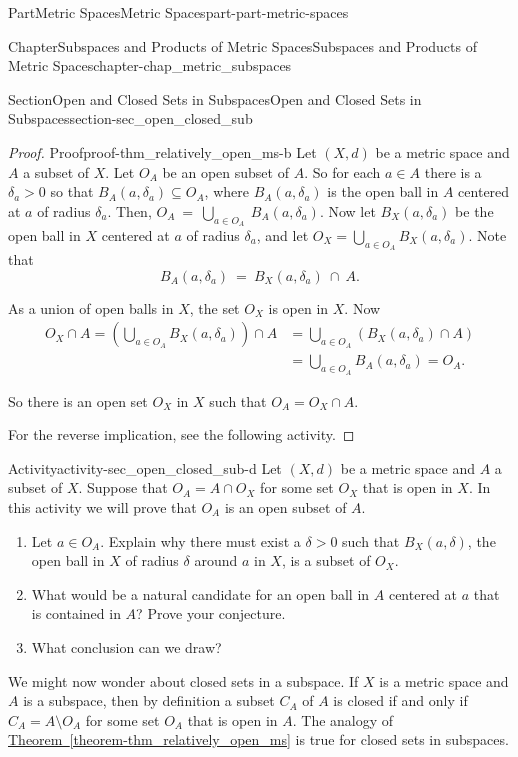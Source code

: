 \documentclass[oneside,10pt,]{book}
\newcommand{\xreffont}{\relax}
\numberwithin{equation}{chapter}
\newcommand{\gt}{>}
\newcommand{\amp}{&}
\begin{document}
\begin{partptx}{Part}{Metric Spaces}{}{Metric Spaces}{}{}{part-part-metric-spaces}
\begin{chapterptx}{Chapter}{Subspaces and Products of Metric Spaces}{}{Subspaces and Products of Metric Spaces}{}{}{chapter-chap_metric_subspaces}
\begin{sectionptx}{Section}{Open and Closed Sets in Subspaces}{}{Open and Closed Sets in Subspaces}{}{}{section-sec_open_closed_sub}
\begin{proof}{Proof}{}{proof-thm_relatively_open_ms-b}
Let \((X,d)\) be a metric space and \(A\) a subset of \(X\). Let \(O_A\) be an open subset of \(A\). So for each \(a \in A\) there is a \(\delta_a \gt 0\) so that \(B_A(a, \delta_a) \subseteq O_A\), where \(B_A(a, \delta_a)\) is the open ball in \(A\) centered at \(a\) of radius \(\delta_a\). Then, \(O_A~=~\bigcup_{a \in O_A}~B_A(a, \delta_a)\). Now let \(B_X(a, \delta_a)\) be the open ball in \(X\) centered at \(a\) of radius \(\delta_a\), and let \(O_X = \bigcup_{a \in O_A} B_X(a, \delta_a)\). Note that%
\begin{equation*}
B_A(a, \delta_a)~=~B_X(a, \delta_a)~\cap~A\text{.}
\end{equation*}
%
\par
As a union of open balls in \(X\), the set \(O_X\) is open in \(X\). Now%
\begin{align*}
O_X \cap A = \left(\bigcup_{a \in O_A} B_X(a, \delta_a) \right) \cap A \amp = \bigcup_{a \in O_A} \left( B_X(a, \delta_a) \cap A \right)\\
\amp = \bigcup_{a \in O_A} B_A(a, \delta_a) = O_A\text{.}
\end{align*}
%
\par
So there is an open set \(O_X\) in \(X\) such that \(O_A = O_X \cap A\).%
\par
For the reverse implication, see the following activity.%
\end{proof}
\begin{activity}{Activity}{}{activity-sec_open_closed_sub-d}%
Let \((X,d)\) be a metric space and \(A\) a subset of \(X\). Suppose that \(O_A = A \cap O_X\) for some set \(O_X\) that is open in \(X\). In this activity we will prove that \(O_A\) is an open subset of \(A\).%
\begin{enumerate}[font=\bfseries,label=(\alph*),ref=\alph*]%
\item{}Let \(a \in O_A\). Explain why there must exist a \(\delta \gt 0\) such that \(B_X(a, \delta)\), the open ball in \(X\) of radius \(\delta\) around \(a\) in \(X\), is a subset of \(O_X\).%
\item{}What would be a natural candidate for an open ball in \(A\) centered at \(a\) that is contained in \(A\)? Prove your conjecture.%
\item{}What conclusion can we draw?%
\end{enumerate}%
\end{activity}%
We might now wonder about closed sets in a subspace. If \(X\) is a metric space and \(A\) is a subspace, then by definition a subset \(C_A\) of \(A\) is closed if and only if \(C_A = A \setminus O_A\) for some set \(O_A\) that is open in \(A\). The analogy of \hyperref[theorem-thm_relatively_open_ms]{Theorem~{\xreffont\ref{theorem-thm_relatively_open_ms}}} is true for closed sets in subspaces.%

\end{sectionptx}
\end{chapterptx}
\end{partptx}
\end{document}
